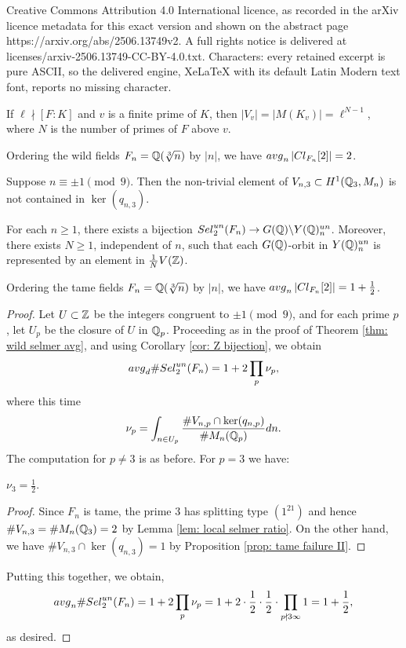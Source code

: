 \documentclass[10pt,a4paper]{amsart}
\def\Cl{{\rm Cl}}
\def\Q{{\rm \mathbb{Q}}}
\def\Sel{{\rm Sel}}
\def\Z{{\rm \mathbb{Z}}}
\def\avg{{\rm avg}}
\def\un{{\rm un}}
\begin{document}
Creative Commons Attribution 4.0 International licence, as recorded in the arXiv licence metadata for this exact version and shown on the abstract page https://arxiv.org/abs/2506.13749v2. A full rights notice is delivered at licenses/arxiv-2506.13749-CC-BY-4.0.txt. Characters: every retained excerpt is pure ASCII, so the delivered engine, XeLaTeX with its default Latin Modern text font, reports no missing character.
\begin{lemma}\label{lem: local selmer ratio}
    If $\ell \nmid [F: K]$ and $v$ is a finite prime of $K$, then  $|V_v| = |M(K_v)| = \ell^{N-1}$, where $N$ is the number of primes of $F$ above $v$. 
\end{lemma}

\begin{theorem}\label{thm: wild selmer avg}
    Ordering the wild fields $F_n = \Q(\sqrt[3]{n})$ by $|n|$, we have $\avg_n\, |\Cl_{F_n}[2]| = 2$.
\end{theorem}

\begin{proposition}\label{prop: tame failure II}
Suppose $n \equiv \pm 1\pmod{9}$. Then the non-trivial element of $V_{n,3} \subset H^1(\Q_3, M_n)$ is not contained in $\ker(q_{n,3})$. 
\end{proposition}

\begin{corollary}\label{cor: Z bijection}
For each $n \geq 1$, there exists a bijection $\Sel_2^\un(F_n) \to G(\Q)\backslash Y(\Q)^\un_n$. Moreover, there exists $N \geq 1$,  independent of $n$, such that each $G(\Q)$-orbit in $Y(\Q)^\un_n$ is represented by an element in $\frac{1}{N}V(\Z)$. 
\end{corollary}

\begin{theorem}\label{thm: tame selmer avg}
    Ordering the tame fields $F_n = \Q(\sqrt[3]{n})$ by $|n|$, we have $\avg_n\, |\Cl_{F_n}[2]|= 1 + \frac12 $.
\end{theorem}

\begin{proof}
 Let $U \subset \Z$ be the integers congruent to $\pm 1\pmod9$, and for each prime $p$, let $U_p$ be the closure of $U$ in $\Q_p$. Proceeding as in the proof of Theorem \ref{thm: wild selmer avg}, and using Corollary \ref{cor: Z bijection}, we obtain
\[\avg_d \#\Sel_2^\un(F_n) = 1 + 2\prod_p \nu_p,\] 
where this time 
\[\nu_p = \int_{n \in U_p} \frac{\#V_{n,p} \cap \ker(q_{n,p})}{\#M_n(\Q_p)}dn.\]
The computation for $p \neq 3$ is as before. For $p = 3$ we have:

\begin{lemma}
$\nu_3 = \frac12$.
\end{lemma}
\begin{proof}
Since $F_n$ is tame, the prime $3$ has splitting type $(1^21)$ and hence $\#V_{n,3} = \#M_n(\Q_3) = 2$ by Lemma \ref{lem: local selmer ratio}. On the other hand, we have $\#V_{n,3} \cap \ker(q_{n,3})= 1$ by Proposition \ref{prop: tame failure II}. 
\end{proof}


Putting this together, we obtain,
\[\avg_n \#\Sel_2^\un(F_n) = 1 + 2\prod_p \nu_p =1 + 2\cdot \frac12 \cdot \frac12 \cdot \prod_{p \nmid 3\infty}  1 =  1 + \frac12,\]
as desired.
\end{proof}
\end{document}

